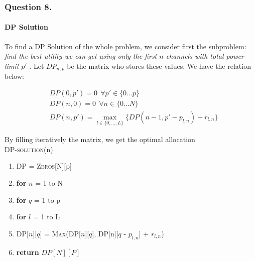 \documentclass[11pt, oneside]{report}
\begin{document}
\subsubsection{Question 8. }
\paragraph{DP Solution} To find a DP Solution of the whole problem, we consider first the subproblem: \textit{find the best utility we can get using only the first $n$ channels with total power limit $p'$ }. Let $DP_{n,p}$ be the matrix who stores these values. We have the relation below: 

\begin{align*}
&DP(0,p') = 0 \ \  \forall p'\in \{0...p\} \\
&DP(n,0) = 0\ \ \forall n\in \{0...N\} \\
&DP(n,p') =  \max_{l \in \{0,...,L\}} \{ DP(n-1, p'-p_{l,n}) + r_{l,n} \}
\end{align*}

By filling iteratively the matrix, we get the optimal allocation\\



\noindent\textsc{DP-solution}(n)
\begin{enumerate}[1\ ]
\setlength{\topsep}{0.05ex}
\setlength{\itemsep}{0.05ex}
\item DP = \textsc{Zeros}[N][p]
\item \textbf{for} $n$ = 1 to N
\item \qquad \textbf{for} $q$ = 1 to p
\item \qquad \qquad \textbf{for} $l$ = 1 to L
\item  \qquad \qquad \qquad DP[$n$][$q$] = \textsc{Max}(DP[$n$][$q$], DP[n][$q$ - $p_{l,n}$] + $r_{l,n}$)
\item \textbf{return} $DP[N][P]$
\end{enumerate}
\end{document}
